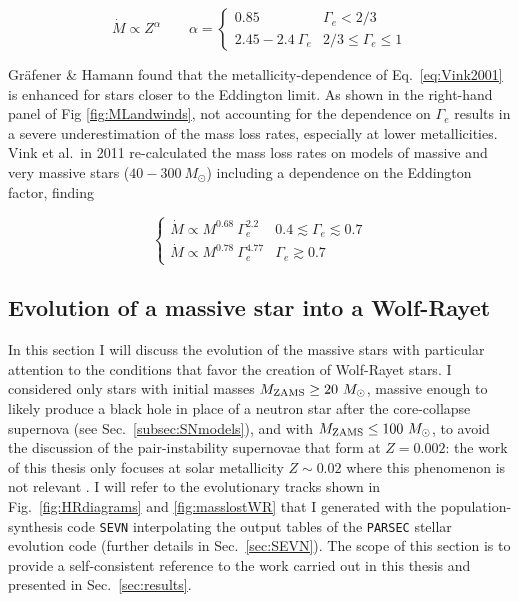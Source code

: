 \documentclass[a4paper,titlepage]{book}     	%
\newcommand{\sun}{\ensuremath{_\odot}}
\newcommand{\mzams}{M_\textup{ZAMS}}
\newcommand{\msun}{\ensuremath{M\sun}}
\begin{document}
\begin{equation}\label{eq:WRwindGH2008}
\dot M \propto Z^{\alpha} \quad \quad  \alpha = 
\begin{cases}
0.85 & \Gamma_e < 2/3 \\
2.45-2.4~\Gamma_e & 2/3 \leq \Gamma_e \leq 1
\end{cases}
\end{equation}

Gr{\"a}fener \& Hamann found that the metallicity-dependence of Eq.\ \ref{eq:Vink2001} is enhanced for stars closer to the Eddington limit. As shown in the right-hand panel of Fig \ref{fig:MLandwinds}, not accounting for the dependence on $\Gamma_e$ results in a severe underestimation of the mass loss rates, especially at lower metallicities.\\

Vink et al.\ in 2011 \cite{Vink2011} re-calculated the mass loss rates on models of massive and very massive stars ($40-300~\msun$) including a dependence on the Eddington factor, finding

\begin{equation}\label{eq:Vink2011}
\begin{cases}
\dot M \propto M^{0.68}\ \Gamma_e^{2.2} & 0.4 \lesssim \Gamma_e \lesssim 0.7 \\
\dot M \propto M^{0.78}\ \Gamma_e^{4.77} & \Gamma_e \gtrsim 0.7
\end{cases}
\end{equation}





\subsection{Evolution of a massive star into a Wolf-Rayet}\label{subsec:stellarevo}

In this section I will discuss the evolution of the massive stars with particular attention to the conditions that favor the creation of Wolf-Rayet stars. I considered only stars with initial masses $\mzams \geq 20~\msun$, massive enough to likely produce a black hole in place of a neutron star after the core-collapse supernova (see Sec.\ \ref{subsec:SNmodels}), and with $\mzams \leq 100~\msun$, to avoid the discussion of the pair-instability supernovae that form at $Z=0.002$: the work of this thesis only focuses at solar metallicity $Z\sim 0.02$ where this phenomenon is not relevant \cite{spera2017_pisnSNe}. I will refer to the evolutionary tracks shown in Fig.\ \ref{fig:HRdiagrams} and \ref{fig:masslostWR} that I generated with the population-synthesis code \texttt{SEVN} \cite{spera2019_mergingBBH} interpolating the output tables of the \texttt{PARSEC} stellar evolution code \cite{parsec2015_chen} (further details in Sec.\ \ref{sec:SEVN}). The scope of this section is to provide a self-consistent reference to the work carried out in this thesis and presented in Sec.\ \ref{sec:results}. 
\end{document}

